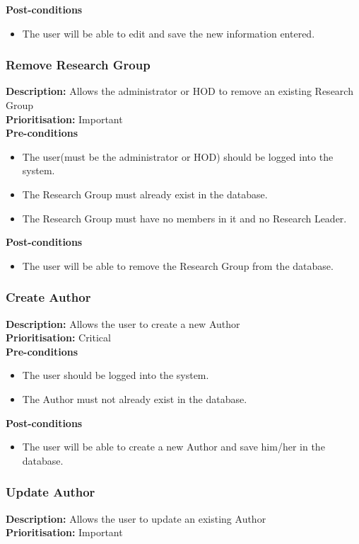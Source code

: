 \documentclass[a4paper]{article}
\begin{document}
	\textbf{Post-conditions}
	 \begin{itemize}
		\item The user will be able to edit and save the new information entered.
	\end{itemize}
	\pagebreak
	\subsubsection{Remove Research Group}
	\textbf{Description:} Allows the administrator or HOD to remove an existing Research Group\\
	\textbf{Prioritisation:} Important\\
	
	\textbf{Pre-conditions}
	 \begin{itemize}
		\item The user(must be the administrator or HOD) should be logged into the system.
		\item The Research Group must already exist in the database.
		\item The Research Group must have no members in it and no Research Leader.
	\end{itemize}
	
	\textbf{Post-conditions}
	 \begin{itemize}
		\item The user will be able to remove the Research Group from the database.
	\end{itemize}
	\pagebreak
	\subsubsection{Create Author}
	\textbf{Description:} Allows the user to create a new Author\\
	\textbf{Prioritisation:} Critical\\
	
	\textbf{Pre-conditions}
	 \begin{itemize}
		\item The user should be logged into the system.
		\item The Author must not already exist in the database.
	\end{itemize}
	
	\textbf{Post-conditions}
	 \begin{itemize}
		\item The user will be able to create a new Author and save him/her in the database.
	\end{itemize}
	\pagebreak
	\subsubsection{Update Author}
	\textbf{Description:} Allows the user to update an existing Author\\
	\textbf{Prioritisation:} Important\\
	
\end{document}
